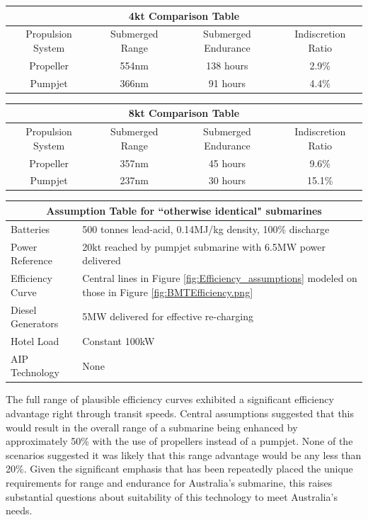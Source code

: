 \documentclass{article}\usepackage[]{graphicx}\usepackage[]{color}
\begin{document}
\begin{tcolorbox}[width=0.9\textwidth, center, colback=blue!5!white,colframe=blue!75!black, title= Quantitative comparison under central assumptions]
\begin{center}
\begin{tabular}{ |c||c|c|c| }
 \hline
 \multicolumn{4}{|c|}{4kt Comparison Table} \\
 \hline
 Propulsion System & Submerged Range & Submerged Endurance &Indiscretion Ratio\\
 \hline
 Propeller &554nm & 138 hours & 2.9\%\\
 Pumpjet & 366nm & 91 hours & 4.4\%\\
 \hline
\end{tabular}

\vspace{6mm}
\begin{tabular}{ |c||c|c|c| }
 \hline
 \multicolumn{4}{|c|}{8kt Comparison Table} \\
 \hline
 Propulsion System & Submerged Range & Submerged Endurance & Indiscretion Ratio\\
 \hline
 Propeller &357nm & 45 hours & 9.6\%\\
 Pumpjet & 237nm & 30 hours & 15.1\%\\
 \hline
\end{tabular}
\vspace{6mm}

\begin{tabular}{ |p{3cm}|p{11cm}| }
 \hline
 \multicolumn{2}{|c|}{Assumption Table for ``otherwise identical" submarines} \\
 \hline
 Batteries & 500 tonnes lead-acid, 0.14MJ/kg density, 100\% discharge\\
 Power Reference & 20kt reached by pumpjet submarine with 6.5MW power delivered\\
 Efficiency Curve & Central lines in Figure \ref{fig:Efficiency_assumptions} modeled on those in Figure \ref{fig:BMTEfficiency.png}\\
 Diesel Generators & 5MW delivered for effective re-charging\\
 Hotel Load & Constant 100kW\\
 AIP Technology & None\\
 \hline
\end{tabular}

\end{center}
\end{tcolorbox}

The full range of plausible efficiency curves exhibited a significant efficiency advantage right through transit speeds.  Central assumptions suggested that this would result in the overall range of a submarine being enhanced by approximately 50\% with the use of propellers instead of a pumpjet.  None of the scenarios suggested it was likely that this range advantage would be any less than 20\%.  Given the significant emphasis that has been repeatedly placed the unique requirements for range and endurance for Australia's submarine, this raises substantial questions about suitability of this technology to meet Australia's needs.
\end{document}
